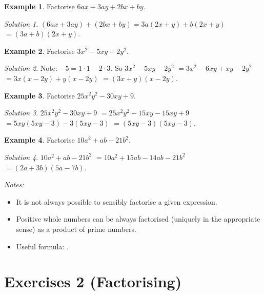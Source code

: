 \documentclass[
  12pt,
  oneside]{book}
\providecommand{\tightlist}{%
  \setlength{\itemsep}{0pt}\setlength{\parskip}{0pt}}
\theoremstyle{definition}
\theoremstyle{definition}
\newtheorem{example}{Example}[chapter]
\theoremstyle{definition}
\theoremstyle{definition}
\theoremstyle{remark}
\newtheorem*{solution}{Solution}
\begin{document}
\begin{example}
Factorise \(6ax+3ay+2bx+by\).
\end{example}

\begin{solution}
\((6ax+3ay)+(2bx+by) = 3a(2x+y)+b(2x+y)\) \(=(3a+b)(2x+y)\).
\end{solution}

\begin{example}
Factorise \(3x^2-5xy-2y^2\).
\end{example}

\begin{solution}
Note: \(-5=1\cdot 1-2\cdot 3\).
So \(3x^2-5xy-2y^2\) \(=3x^2- 6xy + xy-2y^2\) \(=3x(x-2y)+y(x-2y)\) \(=(3x+y)(x-2y)\).
\end{solution}

\begin{example}
Factorise \(25x^2y^2-30xy+9\).
\end{example}

\begin{solution}
\(25x^2y^2-30xy+9\) \(=25x^2y^2 -15xy -15xy +9\) \(=5xy(5xy-3)-3(5xy-3)\) \(=(5xy-3)(5xy-3)\).
\end{solution}

\begin{example}
Factorise \(10a^2+ab-21b^2\).
\end{example}

\begin{solution}
\(10a^2+ab-21b^2\) \(=10a^2 +15ab - 14ab -21b^2\) \(=(2a+3b)(5a-7b)\).
\end{solution}

\emph{Notes:}

\begin{itemize}
\tightlist
\item
  It is not always possible to sensibly factorise a given expression.
\item
  Positive whole numbers can be always factorised (uniquely in the appropriate sense) as a product of prime numbers.
\item
  Useful formula: .
\end{itemize}

\hypertarget{exercises-2-factorising}{%
\chapter*{Exercises 2 (Factorising)}\label{exercises-2-factorising}}
\end{document}
